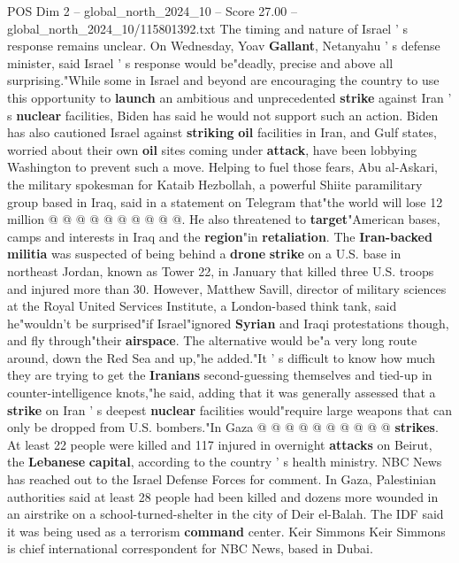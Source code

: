 \begin{textsample}{POS Dim 2 – global\_north\_2024\_10 – Score 27.00 – global\_north\_2024\_10/115801392.txt}
The timing and nature of Israel ' s response remains unclear.
On Wednesday, Yoav \textbf{Gallant}, Netanyahu ' s defense minister, said Israel ' s response would be"deadly, precise and above all surprising."While some in Israel and beyond are encouraging the country to use this opportunity to \textbf{launch} an ambitious and unprecedented \textbf{strike} against Iran ' s \textbf{nuclear} facilities, Biden has said he would not support such an action.
Biden has also cautioned Israel against \textbf{striking} \textbf{oil} facilities in Iran, and Gulf states, worried about their own \textbf{oil} sites coming under \textbf{attack}, have been lobbying Washington to prevent such a move.
Helping to fuel those fears, Abu al-Askari, the military spokesman for Kataib Hezbollah, a powerful Shiite paramilitary group based in Iraq, said in a statement on Telegram that"the world will lose 12 million @ @ @ @ @ @ @ @ @ @.
He also threatened to \textbf{target}"American bases, camps and interests in Iraq and the \textbf{region}"in \textbf{retaliation}.
The \textbf{Iran-backed} \textbf{militia} was suspected of being behind a \textbf{drone} \textbf{strike} on a U.S. base in northeast Jordan, known as Tower 22, in January that killed three U.S. troops and injured more than 30.
However, Matthew Savill, director of military sciences at the Royal United Services Institute, a London-based think tank, said he"wouldn't be surprised"if Israel"ignored \textbf{Syrian} and Iraqi protestations though, and fly through"their \textbf{airspace}.
The alternative would be"a very long route around, down the Red Sea and up,"he added."It ' s difficult to know how much they are trying to get the \textbf{Iranians} second-guessing themselves and tied-up in counter-intelligence knots,"he said, adding that it was generally assessed that a \textbf{strike} on Iran ' s deepest \textbf{nuclear} facilities would"require large weapons that can only be dropped from U.S. bombers."In Gaza @ @ @ @ @ @ @ @ @ @ \textbf{strikes}.
At least 22 people were killed and 117 injured in overnight \textbf{attacks} on Beirut, the \textbf{Lebanese} \textbf{capital}, according to the country ' s health ministry.
NBC News has reached out to the Israel Defense Forces for comment.
In Gaza, Palestinian authorities said at least 28 people had been killed and dozens more wounded in an airstrike on a school-turned-shelter in the city of Deir el-Balah.
The IDF said it was being used as a terrorism \textbf{command} center.
Keir Simmons Keir Simmons is chief international correspondent for NBC News, based in Dubai.

\end{textsample}
